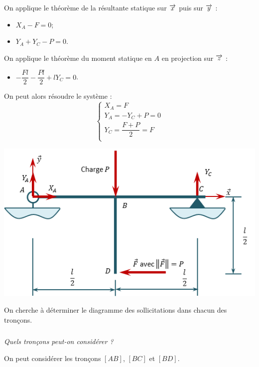 \documentclass[10pt,fleqn]{article} %
\begin{document}
\begin{multicols}{2}
\begin{corrige}
\begin{minipage}[c]{.47\linewidth}
On applique le théorème de la résultante statique sur $\overrightarrow{x}$ puis sur $\overrightarrow{y}$ :
\begin{itemize}[label=,font=\color{ocre}] 
\item $X_A-F=0$;
\item $Y_A+Y_C-P=0$.
\end{itemize}
On applique le théorème du moment statique en $A$ en projection sur $\overrightarrow{z}$ :
\begin{itemize}[label=,font=\color{ocre}] 
\item $-\dfrac{Fl}{2}-\dfrac{Pl}{2}+lY_C=0$.
\end{itemize}
On peut alors résoudre le système : 
$$
\left\{
\begin{array}{l}
X_A=F \\
Y_A=-Y_C+P = 0 \\
Y_C = \dfrac{F+P}{2} = F\\
\end{array}
\right.
$$
\end{minipage}\hfill
\begin{minipage}[c]{.47\linewidth}
\begin{center}
\includegraphics[width=.95\linewidth]{images/exo_03_corr_01}
\end{center}
\end{minipage}
\end{corrige}
\else 
\fi


On cherche à déterminer le diagramme des sollicitations dans chacun des tronçons.

\subparagraph{}
\textit{Quels tronçons peut-on considérer ?}
\ifprof
\begin{corrige}
On peut considérer les tronçons $[AB]$, $[BC]$ et $[BD]$.
\end{corrige}
\else 
\fi


\end{multicols}
\end{document}
